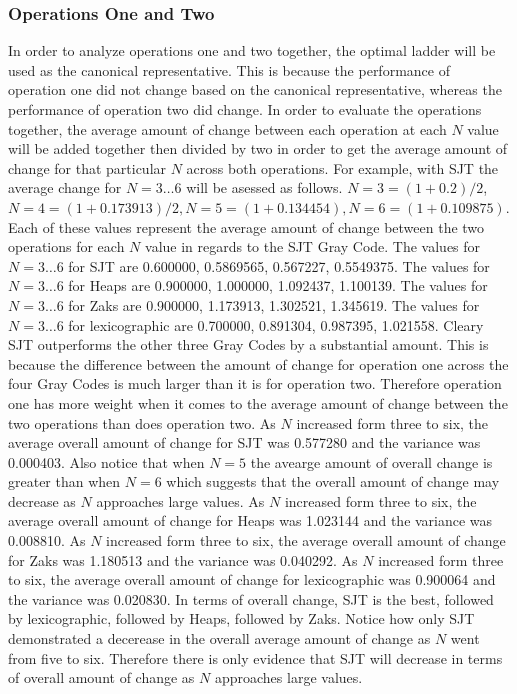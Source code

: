 \subsubsection{Operations One and Two}
In order to analyze operations one and two together, the optimal ladder will be used as the canonical
representative. This is because the performance of operation one did not change based on the 
canonical representative, whereas the performance of operation two did change. In order to evaluate the 
operations together, the average amount of change between each operation at each $N$ value will be added together then 
divided by two in order to get the average amount of change for that particular $N$ across both operations. 
For example, with SJT the average change for $N=3\dots6$ will be asessed as follows. $N=3=(1 + 0.2)/2$, $N=4=(1+ 0.173913)/2, 
N=5=(1+0.134454), N=6=(1+0.109875)$. Each of these values represent the average amount of change between 
the two operations for each $N$ value in regards to the SJT Gray Code. The values for $N=3\dots6$ for
SJT are 0.600000, 0.5869565, 0.567227, 0.5549375. The values for $N=3 \dots 6$ for
Heaps are 0.900000, 1.000000, 1.092437, 1.100139.  The values for $N=3\dots6$ for Zaks 
are 0.900000, 1.173913, 1.302521, 1.345619. The values for $N=3\dots6$ for lexicographic are 
0.700000, 0.891304, 0.987395, 1.021558. Cleary SJT outperforms the other three Gray Codes by a substantial 
amount. This is because the difference between the amount of change for operation one 
across the four Gray Codes is much larger than it is for operation two. Therefore operation one has more 
weight when it comes to the average amount of change between the two operations than does operation two.
As $N$ increased form three to six, the average overall amount of change for SJT was 
0.577280 and the variance was 0.000403. Also notice that when $N=5$ the avearge amount of overall 
change is greater than when $N=6$ which suggests that the overall amount of change may decrease as 
$N$ approaches large values. As $N$ increased form three to six, the average overall amount of change for Heaps was 
1.023144 and the variance was 0.008810.
As $N$ increased form three to six, the average overall amount of change for Zaks was 
1.180513 and the variance was 0.040292. As $N$ increased form three to six, the average overall amount of change for lexicographic was 
0.900064 and the variance was  0.020830. In terms of overall change, SJT is the best, followed by lexicographic, followed by
Heaps, followed by Zaks. Notice how only SJT demonstrated a decerease in the overall average amount of change as $N$ went from five 
to six. Therefore there is only evidence that SJT will decrease in terms of overall amount of change as $N$ approaches 
large values.  